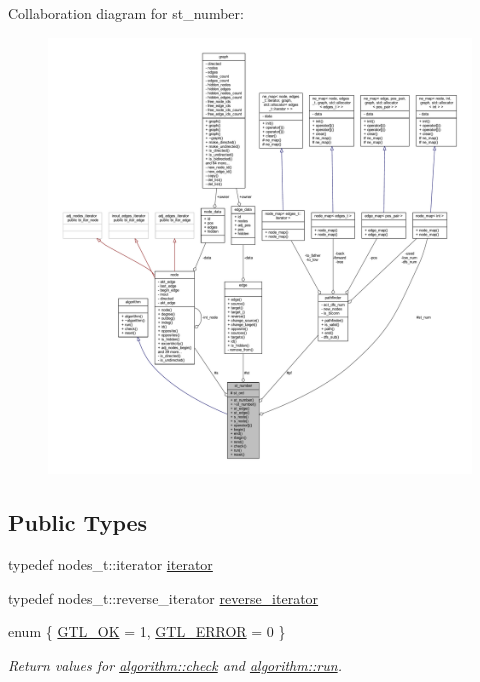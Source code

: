 Collaboration diagram for st\+\_\+number\+:\nopagebreak
\begin{figure}[H]
\begin{center}
\leavevmode
\includegraphics[width=350pt]{classst__number__coll__graph}
\end{center}
\end{figure}
\subsection*{Public Types}
\begin{DoxyCompactItemize}
\item 
typedef nodes\+\_\+t\+::iterator \mbox{\hyperlink{classst__number_a3aa3701636f69a567c5f6a676afafd39}{iterator}}
\item 
typedef nodes\+\_\+t\+::reverse\+\_\+iterator \mbox{\hyperlink{classst__number_a7db0e7ac82d781b75e1712c1fe5c055e}{reverse\+\_\+iterator}}
\item 
enum \{ \mbox{\hyperlink{classalgorithm_af1a0078e153aa99c24f9bdf0d97f6710a5114c20e4a96a76b5de9f28bf15e282b}{G\+T\+L\+\_\+\+OK}} = 1, 
\mbox{\hyperlink{classalgorithm_af1a0078e153aa99c24f9bdf0d97f6710a6fcf574690bbd6cf710837a169510dd7}{G\+T\+L\+\_\+\+E\+R\+R\+OR}} = 0
 \}
\begin{DoxyCompactList}\small\item\em Return values for \mbox{\hyperlink{classalgorithm_a76361fb03ad1cf643affc51821e43bed}{algorithm\+::check}} and \mbox{\hyperlink{classalgorithm_a734b189509a8d6b56b65f8ff772d43ca}{algorithm\+::run}}. \end{DoxyCompactList}\end{DoxyCompactItemize}
